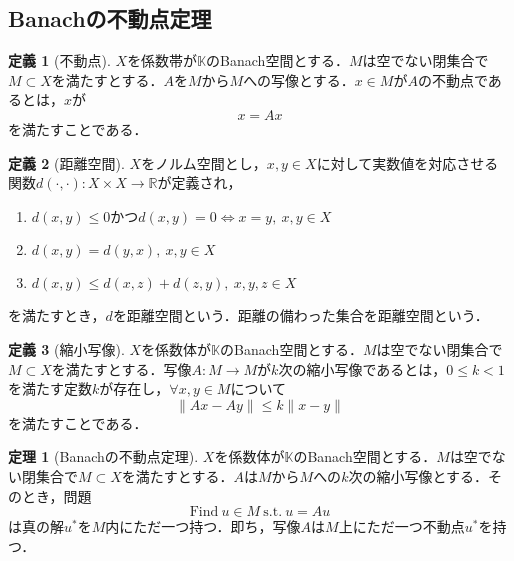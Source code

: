 \documentclass[11pt,a4paper]{jsarticle}
\theoremstyle{definition}
\newtheorem{dfn}{定義}
\newtheorem{thm}{定理}
\begin{document}
\subsection{Banachの不動点定理}
\begin{dfn}[不動点]
  $X$を係数帯が$\mathbb{K}$のBanach空間とする．$M$は空でない閉集合で$M\subset X$を満たすとする．$A$を$M$から$M$への写像とする．$x\in M$が$A$の不動点であるとは，$x$が
  \begin{equation*}
    x=Ax
  \end{equation*}
  を満たすことである．
\end{dfn}

\begin{dfn}[距離空間]
  $X$をノルム空間とし，$x,y\in X$に対して実数値を対応させる関数$d(\cdot,\cdot):X\times X\rightarrow \mathbb{R}$が定義され，
  \begin{enumerate}
    \item $d(x,y) \leq 0$かつ$d(x,y)=0 \Leftrightarrow x=y,\ x,y\in X$
    \item $d(x,y)=d(y,x),\ x,y\in X$
    \item $d(x,y)\leq d(x,z) + d(z,y),\ x,y,z\in X$
  \end{enumerate}
  を満たすとき，$d$を距離空間という．距離の備わった集合を距離空間という．
\end{dfn}

\begin{dfn}[縮小写像]
  $X$を係数体が$\mathbb{K}$のBanach空間とする．$M$は空でない閉集合で$M\subset X$を満たすとする．写像$A:M\rightarrow M$が$k$次の縮小写像であるとは，$0\leq k<1$を満たす定数$k$が存在し，$\forall x,y \in M$について
  \begin{equation*}
    \|Ax-Ay\|\leq k\|x-y\|
  \end{equation*}
  を満たすことである．
\end{dfn}

\begin{thm}[Banachの不動点定理]
  $X$を係数体が$\mathbb{K}$のBanach空間とする．$M$は空でない閉集合で$M\subset X$を満たすとする．$A$は$M$から$M$への$k$次の縮小写像とする．そのとき，問題
  \begin{equation}
    \label{equ:Banachの不動点定理}
    \mathrm{Find}\ u\in M\ \mathrm{s.t.} \ u=Au
  \end{equation}
  は真の解$u^*$を$M$内にただ一つ持つ．即ち，写像$A$は$M$上にただ一つ不動点$u^*$を持つ．
\end{thm}
\end{document}
